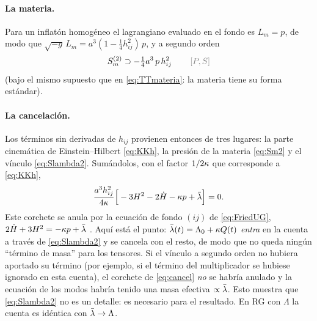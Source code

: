\paragraph{La materia.} Para un inflatón homogéneo el lagrangiano evaluado en el fondo es $L_m=p$, de modo que $\sqrt{-g}\,L_m=a^3(1-\tfrac14h_{ij}^2)\,p$, y a segundo orden
\begin{equation}
S_m^{(2)}\supset-\tfrac14a^3\,p\,h_{ij}^2\qquad\etq{P, S}
\label{eq:Sm2}
\end{equation}
(bajo el mismo supuesto que en \eqref{eq:TTmateria}: la materia tiene su forma estándar).

\paragraph{La cancelación.} Los términos sin derivadas de $h_{ij}$ provienen entonces de tres lugares: la parte cinemática de Einstein--Hilbert \eqref{eq:KKh}, la presión de la materia \eqref{eq:Sm2} y el vínculo \eqref{eq:Slambda2}. Sumándolos, con el factor $1/2\kappa$ que corresponde a \eqref{eq:KKh},
\begin{equation}
\frac{a^3h_{ij}^2}{4\kappa}\Big[-3H^2-2\dot H-\kappa p+\bar\lambda\Big]=0.
\label{eq:cancel}
\end{equation}
Este corchete se anula por la ecuación de fondo $(ij)$ de \eqref{eq:FriedUG}, $2\dot H+3H^2=-\kappa p+\bar\lambda$ . Aquí está el punto: $\bar\lambda(t)=\Lambda_0+\kappa Q(t)$ \emph{entra} en la cuenta a través de \eqref{eq:Slambda2} y se cancela con el resto, de modo que no queda ningún ``término de masa'' para los tensores. Si el vínculo a segundo orden no hubiera aportado su término (por ejemplo, si el término del multiplicador se hubiese ignorado en esta cuenta), el corchete de \eqref{eq:cancel} \emph{no} se habría anulado y la ecuación de los modos habría tenido una masa efectiva $\propto\bar\lambda$. Esto muestra que \eqref{eq:Slambda2} no es un detalle: es necesario para el resultado. En RG con $\Lambda$ la cuenta es idéntica con $\bar\lambda\to\Lambda$.

